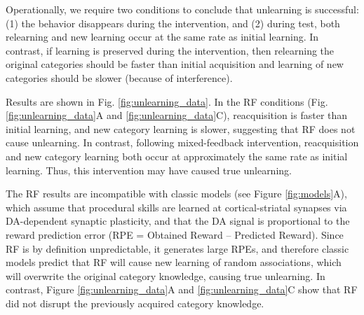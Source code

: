 \documentclass[apacite,draftfirst,man]{apa6}
\begin{document}
Operationally, we require two conditions to conclude that unlearning is
successful: (1) the behavior disappears during the intervention, and (2) during
test, both relearning and new learning occur at the same rate as initial
learning. In contrast, if learning is preserved during the intervention, then
relearning the original categories should be faster than initial acquisition and
learning of new categories should be slower (because of interference).

Results are shown in Fig. \ref{fig:unlearning_data}. In the RF conditions (Fig.
\ref{fig:unlearning_data}A and \ref{fig:unlearning_data}C), reacquisition is
faster than initial learning, and new category learning is slower, suggesting
that RF does not cause unlearning. In contrast, following mixed-feedback
intervention, reacquisition and new category learning both occur at
approximately the same rate as initial learning. Thus, this intervention may
have caused true unlearning.

The RF results are incompatible with classic models (see Figure
\ref{fig:models}A), which assume that procedural skills are learned at
cortical-striatal synapses via DA-dependent synaptic plasticity, and that the DA
signal is proportional to the reward prediction error (RPE = Obtained Reward --
Predicted Reward). Since RF is by definition unpredictable, it generates large
RPEs, and therefore classic models predict that RF will cause new learning of
random associations, which will overwrite the original category knowledge,
causing true unlearning. In contrast, Figure \ref{fig:unlearning_data}A and
\ref{fig:unlearning_data}C show that RF did not disrupt the previously acquired
category knowledge.
\end{document}

